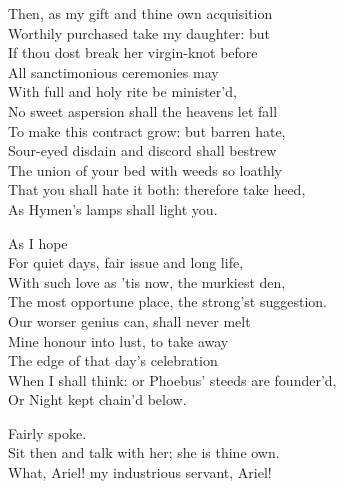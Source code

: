 \begin{verse_speech}[Prospero] 
Then, as my gift and thine own acquisition\\
Worthily purchased take my daughter: but\\
If thou dost break her virgin-knot before\\
All sanctimonious ceremonies may\\
With full and holy rite be minister'd,\\
No sweet aspersion shall the heavens let fall\\
To make this contract grow: but barren hate,\\
Sour-eyed disdain and discord shall bestrew\\
The union of your bed with weeds so loathly\\
That you shall hate it both: therefore take heed,\\
As Hymen's lamps shall light you.
\end{verse_speech}

\begin{verse_speech}[Ferdinand] 
As I hope\\
For quiet days, fair issue and long life,\\
With such love as 'tis now, the murkiest den,\\
The most opportune place, the strong'st suggestion.\\
Our worser genius can, shall never melt\\
Mine honour into lust, to take away\\
The edge of that day's celebration\\
When I shall think: or Phoebus' steeds are founder'd,\\
Or Night kept chain'd below.
\end{verse_speech}

\begin{verse_speech}[Prospero] 
Fairly spoke.\\
Sit then and talk with her; she is thine own.\\
What, Ariel! my industrious servant, Ariel!
\end{verse_speech}



